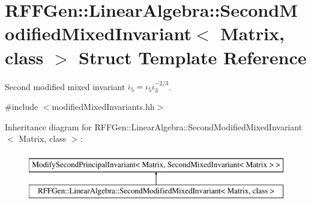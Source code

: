 \hypertarget{structRFFGen_1_1LinearAlgebra_1_1SecondModifiedMixedInvariant}{\section{R\-F\-F\-Gen\-:\-:Linear\-Algebra\-:\-:Second\-Modified\-Mixed\-Invariant$<$ Matrix, class $>$ Struct Template Reference}
\label{structRFFGen_1_1LinearAlgebra_1_1SecondModifiedMixedInvariant}
}


Second modified mixed invariant $\bar\iota_5=\iota_5\iota_3^{-2/3}$.  




{\ttfamily \#include $<$modified\-Mixed\-Invariants.\-hh$>$}

Inheritance diagram for R\-F\-F\-Gen\-:\-:Linear\-Algebra\-:\-:Second\-Modified\-Mixed\-Invariant$<$ Matrix, class $>$\-:\begin{figure}[H]
\begin{center}
\leavevmode
\includegraphics[height=2.000000cm]{structRFFGen_1_1LinearAlgebra_1_1SecondModifiedMixedInvariant}
\end{center}
\end{figure}

